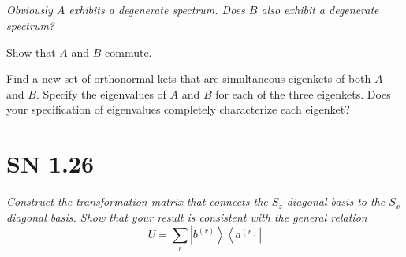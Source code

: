 \documentclass{article}
\begin{document}
\subsection{}
\textit{Obviously $A$ exhibits a degenerate spectrum. Does $B$ also exhibit a degenerate spectrum?}

Show that $A$ and $B$ commute.

Find a new set of orthonormal kets that are simultaneous eigenkets of both $A$ and $B .$ Specify the eigenvalues of $A$ and $B$ for each of the three eigenkets. Does your specification of eigenvalues completely characterize each eigenket?


\newpage
\section{SN 1.26}
\textit{Construct the transformation matrix that connects the $S_{z}$ diagonal basis to the $S_{x}$ diagonal basis. Show that your result is consistent with the general relation
$$
U=\sum_{r}\left|b^{(r)}\right\rangle\left\langle a^{(r)}\right|
$$}
\end{document}
